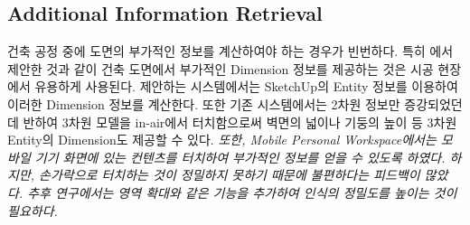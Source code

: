 \subsection{Additional Information Retrieval}
건축 공정 중에 도면의 부가적인 정보를 계산하여야 하는 경우가 빈번하다. 특히 \cite{song_penlight:_2009}에서 제안한 것과 같이 건축 도면에서 부가적인 Dimension 정보를 제공하는 것은 시공 현장에서 유용하게 사용된다. 제안하는 시스템에서는 SketchUp의 Entity 정보를 이용하여 이러한 Dimension 정보를 계산한다. 또한 기존 시스템에서는 2차원 정보만 증강되었던데 반하여 3차원 모델을 in-air에서 터치함으로써 벽면의 넓이나 기둥의 높이 등 3차원 Entity의 Dimension도 제공할 수 있다. \textit{또한, Mobile Personal Workspace에서는 모바일 기기 화면에 있는 컨텐츠를 터치하여 부가적인 정보를 얻을 수 있도록 하였다. 하지만, 손가락으로 터치하는 것이 정밀하지 못하기 때문에 불편하다는 피드백이 많았다. 추후 연구에서는 영역 확대와 같은 기능을 추가하여 인식의 정밀도를 높이는 것이 필요하다.}


